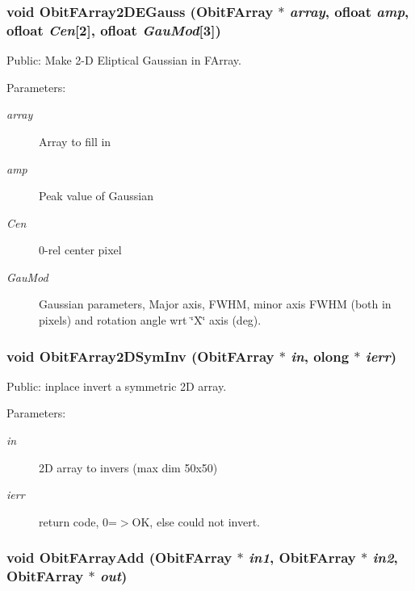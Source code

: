 \subsubsection{\setlength{\rightskip}{0pt plus 5cm}void Obit\-FArray2DEGauss ({\bf Obit\-FArray} $\ast$ {\em array}, {\bf ofloat} {\em amp}, {\bf ofloat} {\em Cen}[2], {\bf ofloat} {\em Gau\-Mod}[3])}\label{ObitFArray_8c_a63}


Public: Make 2-D Eliptical Gaussian in FArray. 

\begin{Desc}
\item[Parameters:]
\begin{description}
\item[{\em array}]Array to fill in \item[{\em amp}]Peak value of Gaussian \item[{\em Cen}]0-rel center pixel \item[{\em Gau\-Mod}]Gaussian parameters, Major axis, FWHM, minor axis FWHM (both in pixels) and rotation angle wrt \char`\"{}X\char`\"{} axis (deg). \end{description}
\end{Desc}
\subsubsection{\setlength{\rightskip}{0pt plus 5cm}void Obit\-FArray2DSym\-Inv ({\bf Obit\-FArray} $\ast$ {\em in}, {\bf olong} $\ast$ {\em ierr})}\label{ObitFArray_8c_a61}


Public: inplace invert a symmetric 2D array. 

\begin{Desc}
\item[Parameters:]
\begin{description}
\item[{\em in}]2D array to invers (max dim 50x50) \item[{\em ierr}]return code, 0=$>$OK, else could not invert. \end{description}
\end{Desc}
\subsubsection{\setlength{\rightskip}{0pt plus 5cm}void Obit\-FArray\-Add ({\bf Obit\-FArray} $\ast$ {\em in1}, {\bf Obit\-FArray} $\ast$ {\em in2}, {\bf Obit\-FArray} $\ast$ {\em out})}\label{ObitFArray_8c_a52}



